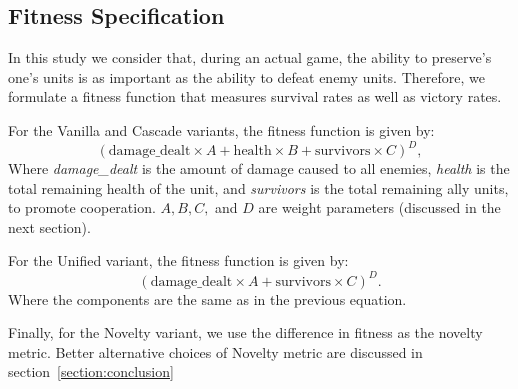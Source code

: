 \subsection{Fitness Specification}

In this study we consider that, during an actual game, the ability
to preserve's one's units is as important as the ability to defeat
enemy units. Therefore, we formulate a fitness function that
measures survival rates as well as victory rates.

For the Vanilla and Cascade variants, the fitness function is
given by:
\begin{equation}\label{eq:fitness_unit}
  (\text{damage\_dealt} \times A + \text{health} \times B +
  \text{survivors} \times C)^D,
\end{equation}
Where \emph{damage\_dealt} is the amount of damage caused to all
enemies, \emph{health} is the total remaining health of the unit, and
\emph{survivors} is the total remaining ally units, to promote
cooperation. $A, B, C,$ and $D$ are weight parameters (discussed in
the next section).

For the Unified variant, the fitness function is given by:
\begin{equation}\label{eq:fitness_group}
  (\text{damage\_dealt} \times A + \text{survivors} \times C)^D.
\end{equation}
Where the components are the same as in the previous equation.

Finally, for the Novelty variant, we use the difference in fitness as
the novelty metric. Better alternative choices of Novelty metric are
discussed in section~\ref{section:conclusion}
